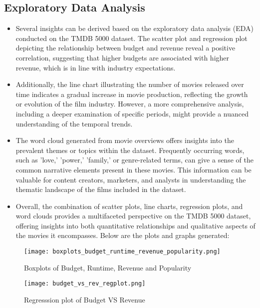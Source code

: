 \documentclass[conference]{IEEEtran}
\begin{document}
\subsection{Exploratory Data Analysis}
\begin{itemize}
    \item Several insights can be derived based on the exploratory data analysis (EDA) conducted on the TMDB 5000 dataset. The scatter plot and regression plot depicting the relationship between budget and revenue reveal a positive correlation, suggesting that higher budgets are associated with higher revenue, which is in line with industry expectations.\\
    \item Additionally, the line chart illustrating the number of movies released over time indicates a gradual increase in movie production, reflecting the growth or evolution of the film industry. However, a more comprehensive analysis, including a deeper examination of specific periods, might provide a nuanced understanding of the temporal trends.\\
    \item The word cloud generated from movie overviews offers insights into the prevalent themes or topics within the dataset. Frequently occurring words, such as 'love,' 'power,' 'family,' or genre-related terms, can give a sense of the common narrative elements present in these movies. This information can be valuable for content creators, marketers, and analysts in understanding the thematic landscape of the films included in the dataset.\\
    \item  Overall, the combination of scatter plots, line charts, regression plots, and word clouds provides a multifaceted perspective on the TMDB 5000 dataset, offering insights into both quantitative relationships and qualitative aspects of the movies it encompasses. Below are the plots and graphs generated:\\
\end{itemize}
 
\begin{figure}[htbp]
    \centerline{\texttt{[image: boxplots\_budget\_runtime\_revenue\_popularity.png]}}
    \caption{Boxplots of Budget, Runtime, Revenue and Popularity}
    \label{fig:enter-label}
\end{figure}

\begin{figure}[htbp]
    \centerline{\texttt{[image: budget\_vs\_rev\_regplot.png]}}
    \caption{Regresssion plot of Budget VS Revenue}
    \label{fig:enter-label}
\end{figure}
\end{document}
